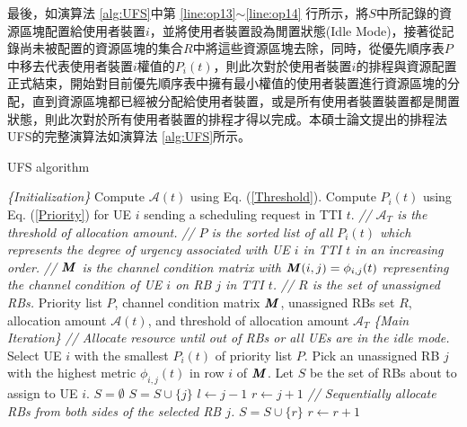 最後，如演算法 \ref{alg:UFS}中第 \ref{line:op13}$\sim$\ref{line:op14} 行所示，將$S$中所記錄的資源區塊配置給使用者裝置$i$，並將使用者裝置設為閒置狀態(Idle Mode)，接著從記錄尚未被配置的資源區塊的集合$R$中將這些資源區塊去除，同時，從優先順序表$P$中移去代表使用者裝置$i$權值的$P_i(t)$，則此次對於使用者裝置$i$的排程與資源配置正式結束，開始對目前優先順序表中擁有最小權值的使用者裝置進行資源區塊的分配，直到資源區塊都已經被分配給使用者裝置，或是所有使用者裝置裝置都是閒置狀態，則此次對於所有使用者裝置的排程才得以完成。本碩士論文提出的排程法UFS的完整演算法如演算法 \ref{alg:UFS}所示。

\begin{algorithm}[H]
  \caption{ UFS algorithm}
  \label{alg:UFS}
  \begin{algorithmic}[1]  
  	\Statex \textit{\{Initialization\}}
  	\Statex Compute $\mathcal{A}(t)$ using Eq. (\ref{Threshold}).
	\Statex Compute $P_i(t)$ using Eq. (\ref{Priority}) for UE $i$ sending a scheduling request in TTI $t$.
	\Statex \textit{// $\mathcal{A}_T$ is the threshold of allocation amount.}
    \Statex \textit{// $P$ is the sorted list of all $P_i(t)$ which represents the degree of urgency associated with UE $i$ in TTI $t$ in an increasing order.}
    \Statex \textit{// $\textbf{\textit{M}}$ is the channel condition matrix with $\textbf{\textit{M}}(i,j)=\phi_{i,j}(t)$ representing the channel condition of UE $i$ on RB $j$ in TTI $t$.}
    \Statex \textit{// $R$ is the set of unassigned RBs.}
    \Require
    	Priority list $P$, channel condition matrix $\textbf{\textit{M}}$, unassigned RBs set $R$, allocation amount $\mathcal{A}(t)$, and threshold of allocation amount $\mathcal{A}_T$ 
    \Statex \textit{\{Main Iteration\}} 
    \Statex \textit{// Allocate resource until out of RBs or all UEs are in the idle mode.}   
    	\label{line:op1}
    \State Select UE $i$ with the smallest $P_i(t)$ of priority list $P$.	\label{line:op2}
    \State Pick an unassigned RB $j$ with the highest metric $\phi_{i,j}(t)$ in row $i$ of $\textbf{\textit{M}}$.	\label{line:op3}
    \State Let $S$ be the set of RBs about to assign to UE $i$.	\label{line:op4}
    \State $S = \emptyset$
    \State $S=S\cup \lbrace j \rbrace$
    \State $l\leftarrow j-1$
    \State $r\leftarrow j+1$	\label{line:op5}
	\Statex \quad\enskip \textit{// Sequentially allocate RBs from both sides of the selected RB $j$.}
    		\State $S=S\cup \lbrace r \rbrace$
    		\State $r\leftarrow r+1$
    	\EndIf	\label{line:op8}
    	
	\end{algorithmic}
\end{algorithm}

